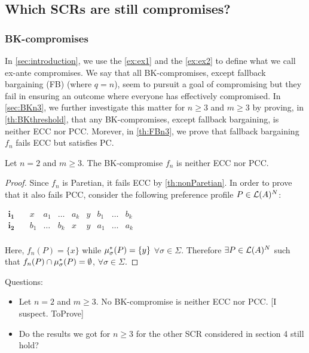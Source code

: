 \documentclass[version=3.21, pagesize, twoside=off, bibliography=totoc, DIV=calc, fontsize=12pt, a4paper]{scrartcl}
\begin{document}
\subsection{Which SCRs are still compromises?}

\subsubsection{BK-compromises}
In \cref{sec:introduction}, we use the \cref{ex:ex1} and the \cref{ex:ex2} to define what we call \oquot ex-ante compromises\cquot. We say that all BK-compromises, except fallback bargaining (FB) (where $q=n$), seem to pursuit a goal of compromising but they fail in ensuring an outcome where everyone has effectively compromised. In \cref{sec:BKn3}, we further investigate this matter for $n\geq3$ and $m\geq3$ by proving, in \cref{th:BKthreshold}, that any BK-compromises, except fallback bargaining, is neither ECC nor PCC. Morever, in \cref{th:FBn3}, we prove that fallback bargaining $f_{n}$ fails ECC but satisfies PC.

\begin{Theorem}
	Let $n=2$ and $m\geq3$. The BK-compromise $f_{n}$ is neither ECC nor PCC. 
\end{Theorem}

\begin{proof}
	Since $f_{n}$ is Paretian, it fails ECC by \cref{th:nonParetian}. In order to prove that it also fails PCC, consider the following preference profile $P\in \mathcal{L}(A)^{N}$:
\begin{center}
	$
	\begin{array}{cccccccccc}
	\mathbf{i_1} \quad &x&a_1&\dots&a_k&y&b_1&\dots&b_k\\
	\mathbf{i_2} \quad &b_1&\dots&b_{k}&x&y&a_1&\dots&a_k\\
	\end{array}
	$
\end{center}
Here, $f_n(P)=\{x\}$ while $\mu_{\sigma}^*(P)=\{y\}$ $\forall \sigma \in \Sigma$. Therefore $\exists P \in  \mathcal{L}(A)^{N}$ such that $f_n(P) \cap \mu_{\sigma}^*(P) = \emptyset$, $\forall \sigma \in \Sigma$.
\end{proof}


Questions:
\begin{itemize}
	\item Let $n=2$ and $m\geq3$. No BK-compromise  is neither ECC nor PCC. [I suspect. ToProve]
	\item Do the results we got for $n\geq3$ for the other SCR considered in section 4 still hold?
\end{itemize}
\end{document}

